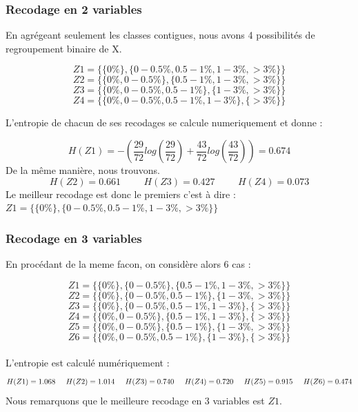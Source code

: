 \documentclass{article}
\begin{document}
\subsubsection{Recodage en 2 variables}

En agrégeant seulement les classes contigues, nous avons 4 possibilités de regroupement binaire de 
X.


\[
Z1 =\{ \{0 \% \} , \{0 - 0.5 \% ,0.5-1 \% ,1-3 \% ,>3 \% \} \}  
\]
\[
Z2 =\{ \{0 \% , 0 - 0.5 \%  \} , \{0.5-1 \% ,1-3 \% ,>3 \% \} \}
\]
\[
Z3 =\{ \{0 \%, 0 - 0.5 \% ,0.5-1 \%  \} , \{1-3 \% ,>3 \% \} \}
\]
\[
Z4 =\{ \{0 \% , 0 - 0.5 \% ,0.5-1 \% ,1-3 \% \} , \{>3 \% \} \}
\]


L'entropie de chacun de ses recodages se calcule numeriquement et donne :

\[
H(Z1) = -\left(\frac{29}{72}log(\frac{29}{72})+\frac{43}{72}log(\frac{43}{72})\right) = 0.674
\]
De la même manière, nous trouvons.
\[
H(Z2) = 0.661 \hspace{1cm} H(Z3) = 0.427 \hspace{1cm} H(Z4) = 0.073
\]
Le meilleur recodage est donc le premiers c'est à dire :
$Z1 =\{ \{0 \% \} , \{0 - 0.5 \% ,0.5-1 \% ,1-3 \% ,>3 \% \} \}$


\subsubsection{Recodage en 3 variables}

En procédant de la meme facon, on considère alors 6 cas :

\[
Z1 =\{ \{0 \% \} , \{0 - 0.5 \%\} ,\{0.5-1 \% ,1-3 \% ,>3 \% \} \}  
\]
\[
  Z2 =\{ \{0 \% \} , \{0 - 0.5\%, 0.5-1 \% \} ,\{1-3 \% ,>3 \% \} \}
\]
\[
  Z3 =\{ \{0 \% \} , \{0 - 0.5\%, 0.5-1 \% ,1-3 \%  \} ,\{>3 \% \} \}
\]
\[
  Z4 =\{ \{0 \%, 0 - 0.5\%\} , \{ 0.5-1 \% ,1-3 \%  \} ,\{>3 \% \} \}
\]
\[
  Z5 =\{ \{0 \%, 0 - 0.5\%\} , \{ 0.5-1 \% \} ,\{1-3 \% , >3 \% \} \}
\]
\[
  Z6 =\{ \{0 \%, 0 - 0.5\%,  0.5-1 \% \} , \{1-3 \%  \} ,\{>3 \% \} \}
\]
\\
L'entropie est calculé numériquement :
\[
H(Z1) = 1.068 \hspace{0.5cm} H(Z2) = 1.014 \hspace{0.5cm} H(Z3) = 0.740 \hspace{0.5cm} H(Z4) = 0.720 \hspace{0,5cm} H(Z5) = 0.915 \hspace{0,5 cm} H(Z6) = 0.474
\]
Nous remarquons que le meilleure recodage en 3 variables est $Z1$.
\end{document}

